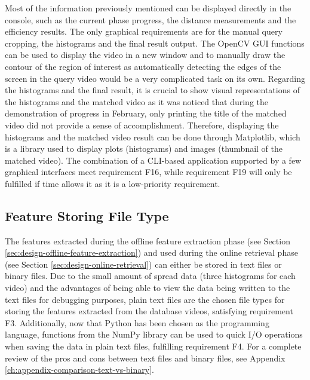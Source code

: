 Most of the information previously mentioned can be displayed directly in the console, such as the current phase progress, the distance measurements and the efficiency results. The only graphical requirements are for the manual query cropping, the histograms and the final result output. The OpenCV GUI functions can be used to display the video in a new window and to manually draw the contour of the region of interest as automatically detecting the edges of the screen in the query video would be a very complicated task on its own. Regarding the histograms and the final result, it is crucial to show visual representations of the histograms and the matched video as it was noticed that during the demonstration of progress in February, only printing the title of the matched video did not provide a sense of accomplishment. Therefore, displaying the histograms and the matched video result can be done through Matplotlib, which is a library used to display plots (histograms) and images (thumbnail of the matched video). The combination of a CLI-based application supported by a few graphical interfaces meet requirement F16, while requirement F19 will only be fulfilled if time allows it as it is a low-priority requirement.


\subsection{Feature Storing File Type}
\label{sec:design-feature-storing-file-type}

The features extracted during the offline feature extraction phase (see Section \ref{sec:design-offline-feature-extraction}) and used during the online retrieval phase (see Section \ref{sec:design-online-retrieval}) can either be stored in text files or binary files. Due to the small amount of spread data (three histograms for each video) and the advantages of being able to view the data being written to the text files for debugging purposes, plain text files are the chosen file types for storing the features extracted from the database videos, satisfying requirement F3. Additionally, now that Python has been chosen as the programming language, functions from the NumPy library can be used to quick I/O operations when saving the data in plain text files, fulfilling requirement F4. For a complete review of the pros and cons between text files and binary files, see Appendix \ref{ch:appendix-comparison-text-vs-binary}.

